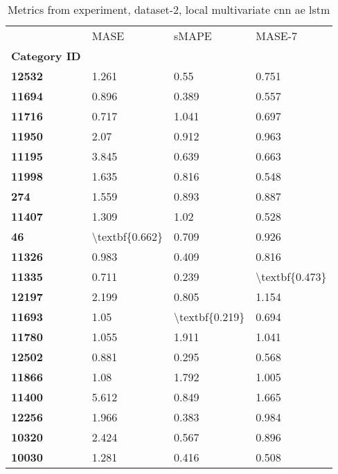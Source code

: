 \begin{table}[h]
\centering
\caption{Metrics from experiment, dataset-2, local multivariate cnn ae lstm}
\label{table:local-multivariate-cnn-ae-lstm-dataset-2}
\begin{tabular}{llll}
\toprule
{} &            MASE &           sMAPE &          MASE-7 \\
\textbf{Category ID} &                 &                 &                 \\
\midrule
\textbf{12532      } &           1.261 &            0.55 &           0.751 \\
\textbf{11694      } &           0.896 &           0.389 &           0.557 \\
\textbf{11716      } &           0.717 &           1.041 &           0.697 \\
\textbf{11950      } &            2.07 &           0.912 &           0.963 \\
\textbf{11195      } &           3.845 &           0.639 &           0.663 \\
\textbf{11998      } &           1.635 &           0.816 &           0.548 \\
\textbf{274        } &           1.559 &           0.893 &           0.887 \\
\textbf{11407      } &           1.309 &            1.02 &           0.528 \\
\textbf{46         } &  \textbackslash textbf\{0.662\} &           0.709 &           0.926 \\
\textbf{11326      } &           0.983 &           0.409 &           0.816 \\
\textbf{11335      } &           0.711 &           0.239 &  \textbackslash textbf\{0.473\} \\
\textbf{12197      } &           2.199 &           0.805 &           1.154 \\
\textbf{11693      } &            1.05 &  \textbackslash textbf\{0.219\} &           0.694 \\
\textbf{11780      } &           1.055 &           1.911 &           1.041 \\
\textbf{12502      } &           0.881 &           0.295 &           0.568 \\
\textbf{11866      } &            1.08 &           1.792 &           1.005 \\
\textbf{11400      } &           5.612 &           0.849 &           1.665 \\
\textbf{12256      } &           1.966 &           0.383 &           0.984 \\
\textbf{10320      } &           2.424 &           0.567 &           0.896 \\
\textbf{10030      } &           1.281 &           0.416 &           0.508 \\
\bottomrule
\end{tabular}
\end{table}
